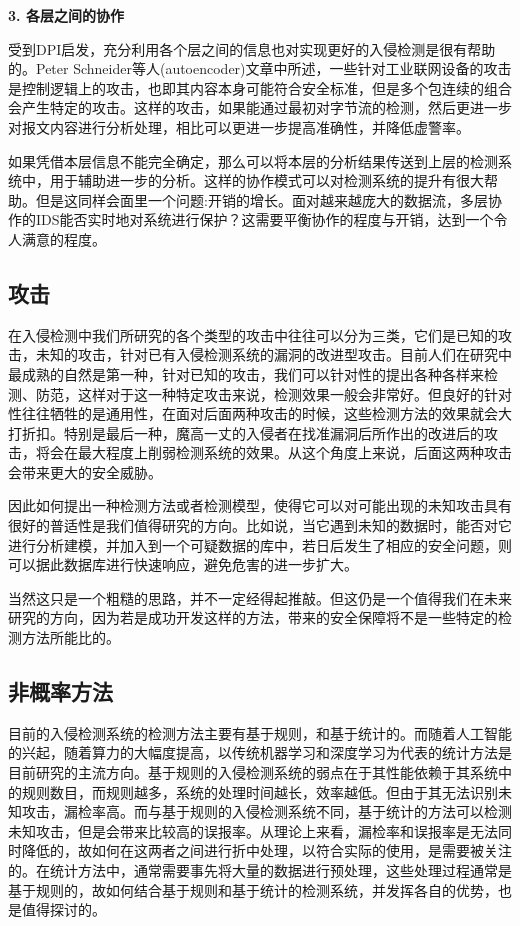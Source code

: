 \documentclass[12pt]{article} %
\begin{document}
\textbf{3. 各层之间的协作}

受到DPI启发，充分利用各个层之间的信息也对实现更好的入侵检测是很有帮助的。Peter Schneider等人(autoencoder)文章中所述，一些针对工业联网设备的攻击是控制逻辑上的攻击，也即其内容本身可能符合安全标准，但是多个包连续的组合会产生特定的攻击。这样的攻击，如果能通过最初对字节流的检测，然后更进一步对报文内容进行分析处理，相比可以更进一步提高准确性，并降低虚警率。

如果凭借本层信息不能完全确定，那么可以将本层的分析结果传送到上层的检测系统中，用于辅助进一步的分析。这样的协作模式可以对检测系统的提升有很大帮助。但是这同样会面里一个问题:开销的增长。面对越来越庞大的数据流，多层协作的IDS能否实时地对系统进行保护？这需要平衡协作的程度与开销，达到一个令人满意的程度。

\subsection{攻击}
\label{attack}

在入侵检测中我们所研究的各个类型的攻击中往往可以分为三类，它们是已知的攻击，未知的攻击，针对已有入侵检测系统的漏洞的改进型攻击。目前人们在研究中最成熟的自然是第一种，针对已知的攻击，我们可以针对性的提出各种各样来检测、防范，这样对于这一种特定攻击来说，检测效果一般会非常好。但良好的针对性往往牺牲的是通用性，在面对后面两种攻击的时候，这些检测方法的效果就会大打折扣。特别是最后一种，魔高一丈的入侵者在找准漏洞后所作出的改进后的攻击，将会在最大程度上削弱检测系统的效果。从这个角度上来说，后面这两种攻击会带来更大的安全威胁。

因此如何提出一种检测方法或者检测模型，使得它可以对可能出现的未知攻击具有很好的普适性是我们值得研究的方向。比如说，当它遇到未知的数据时，能否对它进行分析建模，并加入到一个可疑数据的库中，若日后发生了相应的安全问题，则可以据此数据库进行快速响应，避免危害的进一步扩大。

当然这只是一个粗糙的思路，并不一定经得起推敲。但这仍是一个值得我们在未来研究的方向，因为若是成功开发这样的方法，带来的安全保障将不是一些特定的检测方法所能比的。

\subsection{非概率方法}
\label{nonprob}

目前的入侵检测系统的检测方法主要有基于规则，和基于统计的。而随着人工智能的兴起，随着算力的大幅度提高，以传统机器学习和深度学习为代表的统计方法是目前研究的主流方向。基于规则的入侵检测系统的弱点在于其性能依赖于其系统中的规则数目，而规则越多，系统的处理时间越长，效率越低。但由于其无法识别未知攻击，漏检率高。而与基于规则的入侵检测系统不同，基于统计的方法可以检测未知攻击，但是会带来比较高的误报率。从理论上来看，漏检率和误报率是无法同时降低的，故如何在这两者之间进行折中处理，以符合实际的使用，是需要被关注的。在统计方法中，通常需要事先将大量的数据进行预处理，这些处理过程通常是基于规则的，故如何结合基于规则和基于统计的检测系统，并发挥各自的优势，也是值得探讨的。
\end{document}
